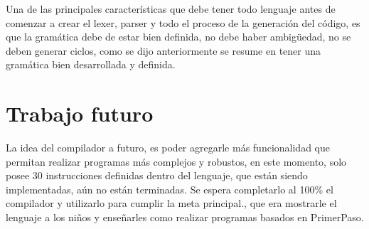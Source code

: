 \documentclass[%
 aip,
 jmp,%
 amsmath,amssymb,
 reprint,%
]{revtex4-1}
\begin{document}
Una de las principales características que debe tener todo lenguaje antes de comenzar a crear el lexer, parser y todo el proceso de la generación del código, es que la gramática debe de estar bien definida, no debe haber ambigüedad, no se deben generar ciclos, como se dijo anteriormente se resume en tener una gramática bien desarrollada y definida.

\section{Trabajo futuro}
La idea del compilador a futuro, es poder agregarle más funcionalidad que permitan realizar programas más complejos y robustos, en este momento, solo posee 30 instrucciones definidas dentro del lenguaje, que están siendo implementadas, aún no están terminadas.
Se espera completarlo al 100\% el compilador y utilizarlo para cumplir la meta principal., que era mostrarle el lenguaje a los niños y enseñarles como realizar programas basados en PrimerPaso.
\end{document}
